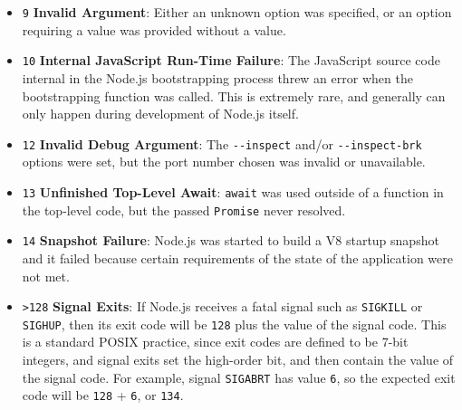 \begin{itemize}
\item
  \texttt{9} \textbf{Invalid Argument}: Either an unknown option was
  specified, or an option requiring a value was provided without a
  value.
\item
  \texttt{10} \textbf{Internal JavaScript Run-Time Failure}: The
  JavaScript source code internal in the Node.js bootstrapping process
  threw an error when the bootstrapping function was called. This is
  extremely rare, and generally can only happen during development of
  Node.js itself.
\item
  \texttt{12} \textbf{Invalid Debug Argument}: The \texttt{-\/-inspect}
  and/or \texttt{-\/-inspect-brk} options were set, but the port number
  chosen was invalid or unavailable.
\item
  \texttt{13} \textbf{Unfinished Top-Level Await}: \texttt{await} was
  used outside of a function in the top-level code, but the passed
  \texttt{Promise} never resolved.
\item
  \texttt{14} \textbf{Snapshot Failure}: Node.js was started to build a
  V8 startup snapshot and it failed because certain requirements of the
  state of the application were not met.
\item
  \texttt{\textgreater{}128} \textbf{Signal Exits}: If Node.js receives
  a fatal signal such as \texttt{SIGKILL} or \texttt{SIGHUP}, then its
  exit code will be \texttt{128} plus the value of the signal code. This
  is a standard POSIX practice, since exit codes are defined to be 7-bit
  integers, and signal exits set the high-order bit, and then contain
  the value of the signal code. For example, signal \texttt{SIGABRT} has
  value \texttt{6}, so the expected exit code will be \texttt{128} +
  \texttt{6}, or \texttt{134}.
\end{itemize}
